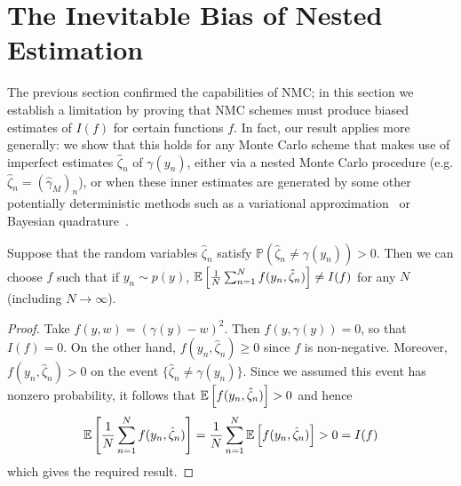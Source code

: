 
\section{The Inevitable Bias of Nested Estimation} 
\label{sec:bias}

The previous section confirmed the capabilities of NMC; in this section we establish a
limitation by proving that NMC schemes must produce biased estimates of $I(f)$ for certain
functions $f$. In fact, our result applies more generally: we show that this holds for any
Monte Carlo scheme that makes use of imperfect estimates $\hat{\zeta}_n$ of $\gamma(y_n)$,
either via a nested Monte Carlo procedure (e.g. $\hat{\zeta}_n = (\hat{\gamma}_M)_n$), or
when these inner estimates are generated by some other potentially deterministic methods
such as a variational approximation~\citep{blei2016variational} or Bayesian
quadrature~\citep{o1991bayes}.
\begin{theorem}
  Suppose that the random variables $\hat{\zeta}_n$ satisfy
    $\mathbb{P}(\hat{\zeta}_n \neq \gamma(y_n)) > 0$.
  Then we can choose $f$ such that if $y_n \sim p(y)$,
    $\mathbb{E}\left[\frac{1}{N} \sum_{n=1}^N f(y_n, \hat{\zeta}_n)\right] \neq I(f)$ for any
    $N$ (including $N\rightarrow\infty$).
\end{theorem}
\begin{proof}
	Take $f(y, w) = (\gamma(y) - w)^2$. Then $f(y, \gamma(y)) = 0$, so that $I(f) = 0$.  On
	the other hand, $f(y_n, \hat{\zeta}_n) \geq 0$ since $f$ is non-negative.
	Moreover, $f(y_n, \hat{\zeta}_n) > 0$ on the event $\{\hat{\zeta}_n \neq \gamma(y_n)\}$.
	Since we assumed this event has nonzero probability, it follows that $\mathbb{E} \left[f(y_n, \hat{\zeta}_n)\right] > 0$ and hence
	\[
	\mathbb{E}\left[\frac{1}{N} \sum_{n=1}^N f(y_n, \hat{\zeta}_n)\right]
	= \frac{1}{N} \sum_{n=1}^N \mathbb{E}\left[f(y_n, \hat{\zeta}_n)\right]
	> 0 = I(f)
	\]
	which gives the required result.
\end{proof}
